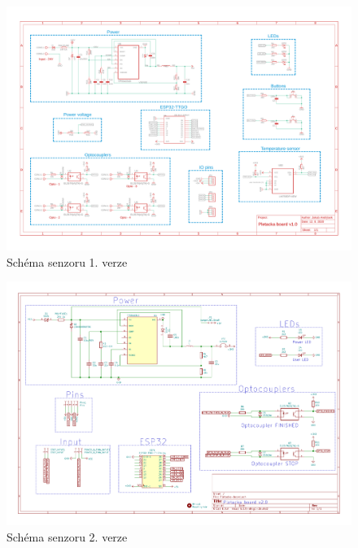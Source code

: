 \chapter{}


\begin{figure}[htbp]
    \centering
    \includegraphics[width=\textwidth]{DATASHEET/Pletacka_board_v1.pdf}
    \caption{Schéma senzoru 1. verze}
    \label{fig:Schemav1}
\end{figure}


\begin{figure}[htbp]
    \centering
    \includegraphics[width=\textwidth]{DATASHEET/Pletacka_board_v2.pdf}
    \caption{Schéma senzoru 2. verze}
    \label{fig:Schemav1}
\end{figure}

